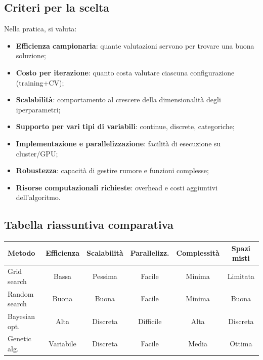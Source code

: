 \documentclass[a4paper,12pt]{report}
\begin{document}
	\subsection{Criteri per la scelta}
	Nella pratica, si valuta:
	\begin{itemize}
		\item \textbf{Efficienza campionaria}: quante valutazioni servono per trovare una buona soluzione;
		\item \textbf{Costo per iterazione}: quanto costa valutare ciascuna configurazione (training+CV);
		\item \textbf{Scalabilità}: comportamento al crescere della dimensionalità degli iperparametri;
		\item \textbf{Supporto per vari tipi di variabili}: continue, discrete, categoriche;
		\item \textbf{Implementazione e parallelizzazione}: facilità di esecuzione su cluster/GPU;
		\item \textbf{Robustezza}: capacità di gestire rumore e funzioni complesse;
		\item \textbf{Risorse computazionali richieste}: overhead e costi aggiuntivi dell'algoritmo.
	\end{itemize}
	
	\subsection{Tabella riassuntiva comparativa}
	\begin{table}[h]
		\centering
		\small
		\begin{tabular}{lccccc}
			\toprule
			\textbf{Metodo} & \textbf{Efficienza} & \textbf{Scalabilità} & \textbf{Parallelizz.} & \textbf{Complessità} & \textbf{Spazi misti}\\
			\midrule
			Grid search & Bassa & Pessima & Facile & Minima & Limitata\\
			Random search & Buona & Buona & Facile & Minima & Buona\\
			Bayesian opt. & Alta & Discreta & Difficile & Alta & Discreta\\
			Genetic alg. & Variabile & Discreta & Facile & Media & Ottima\\
			\bottomrule
		\end{tabular}
	\end{table}
	
\end{document}
